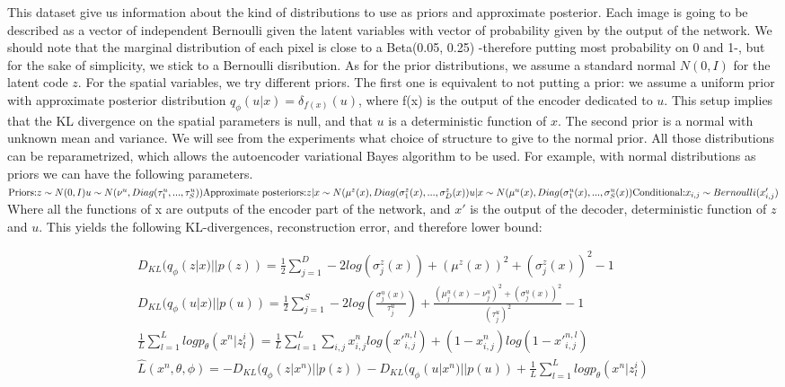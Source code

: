\documentclass[letterpaper, twoside]{article}
\begin{document}
This dataset give us information about the kind of distributions to use as priors and approximate posterior. Each image is going to be described as a vector of independent Bernoulli given the latent variables with vector of probability given by the output of the network. We should note that the marginal distribution of each pixel is close to a Beta(0.05, 0.25) -therefore putting most probability on 0 and 1-, but for the sake of simplicity, we stick to a Bernoulli disribution. As for the prior distributions, we assume a standard normal $N(0, I)$ for the latent code $z$. For the spatial variables, we try different priors. The first one is equivalent to not putting a prior: we assume a uniform prior with approximate posterior distribution $q_\phi(u|x) = \delta_{f(x)}(u)$, where f(x) is the output of the encoder dedicated to $u$. This setup implies that the KL divergence on the spatial parameters is null, and that $u$ is a deterministic function of $x$. The second prior is a normal with unknown mean and variance. We will see from the experiments what choice of structure to give to the normal prior. All those distributions can be reparametrized, which allows the autoencoder variational Bayes algorithm \cite{Kingma.aevb} to be used. 
For example, with normal distributions as priors we can have the following parameters.\\
$
\text{Priors:}\\
z \sim N(0, I)\\
u \sim N(\nu^u, Diag(\tau_1^u, ..., \tau_S^u))\\
\text{Approximate posteriors:}\\
 z | x \sim N(\mu^z(x), Diag(\sigma_1^z(x), ..., \sigma_D^z(x))\\
 u | x \sim N(\mu^u(x), Diag(\sigma_1^u(x), ..., \sigma_S^u(x))\\
 \text{Conditional:}\\
 x_{i, j} \sim Bernoulli(x'_{i, j})
$\\
Where all the functions of x are outputs of the encoder part of the network, and $x'$ is the output of the decoder, deterministic function of $z$ and $u$.
This yields the following KL-divergences, reconstruction error, and therefore lower bound:

\begin{align}
D_{KL}(q_\phi(z|x) || p(z)) = \frac{1}{2} \sum_{j=1}^D  -2 log (\sigma_j^z(x)) + (\mu^z(x))^2 + (\sigma_j^z(x))^2 - 1\\
D_{KL}(q_\phi(u|x) || p(u)) = \frac{1}{2} \sum_{j=1}^S -2 log (\frac{\sigma_j^u(x)}{\tau_j^u}) + \frac{(\mu_j^u(x) - \nu_j^u)^2 + (\sigma_j^u(x))^2}{(\tau_j^u)^2} - 1\\
\frac{1}{L} \sum_{l=1}^L log p_\theta(x^n | z_{l}^i) = \frac{1}{L} \sum_{l=1}^L \sum_{i, j} x_{i,j}^n log({x'}_{i, j}^{n, l}) + (1 - x_{i,j}^n) log(1 - {x'}_{i, j}^{n, l})\\
\hat L(x^n, \theta, \phi) = -D_{KL}(q_\phi(z|x^n) || p(z)) - D_{KL}(q_\phi(u|x^n) || p(u)) + \frac{1}{L} \sum_{l=1}^L log p_\theta(x^n | z_{l}^i)
\end{align}
\end{document}
